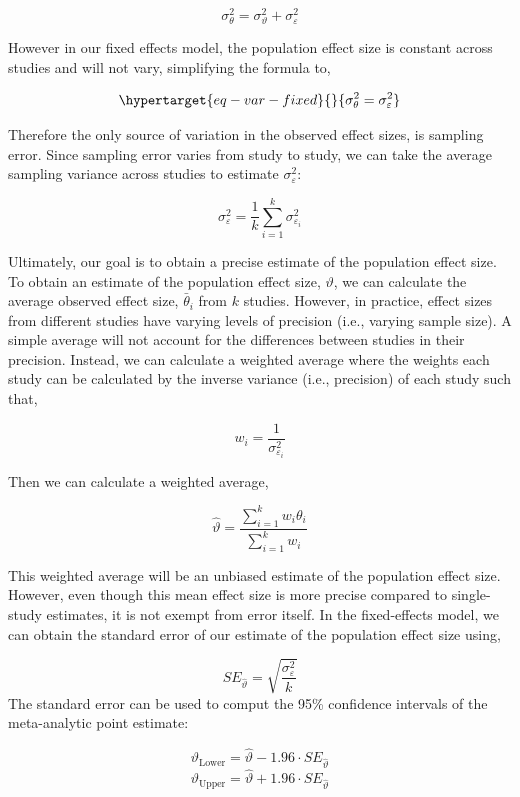 \documentclass[
  letterpaper,
  DIV=11,
  numbers=noendperiod]{scrreprt}
\begin{document}
\[
\sigma^2_\theta = \sigma^2_\vartheta + \sigma^2_\varepsilon
\]

However in our fixed effects model, the population effect size is
constant across studies and will not vary, simplifying the formula to,

\begin{equation}\protect\hypertarget{eq-var-fixed}{}{
\sigma^2_\theta = \sigma^2_\varepsilon
}\label{eq-var-fixed}\end{equation}

Therefore the only source of variation in the observed effect sizes, is
sampling error. Since sampling error varies from study to study, we can
take the average sampling variance across studies to estimate
\(\sigma^2_\varepsilon\):

\[
\sigma^2_\varepsilon=\frac{1}{k}\sum^k_{i=1}\sigma^2_{\varepsilon_i}
\]

Ultimately, our goal is to obtain a precise estimate of the population
effect size. To obtain an estimate of the population effect size,
\(\vartheta\), we can calculate the average observed effect size,
\(\bar{\theta}_i\) from \(k\) studies. However, in practice, effect
sizes from different studies have varying levels of precision (i.e.,
varying sample size). A simple average will not account for the
differences between studies in their precision. Instead, we can
calculate a weighted average where the weights each study can be
calculated by the inverse variance (i.e., precision) of each study such
that,

\[
w_i = \frac{1}{\sigma^2_{\varepsilon_i}}
\]

Then we can calculate a weighted average,

\[
\hat{\vartheta} =\frac{\sum^k_{i=1}w_i\theta_i}{\sum^k_{i=1}w_i}
\]

This weighted average will be an unbiased estimate of the population
effect size. However, even though this mean effect size is more precise
compared to single-study estimates, it is not exempt from error itself.
In the fixed-effects model, we can obtain the standard error of our
estimate of the population effect size using,

\[
SE_\hat{\vartheta} = \sqrt{\frac{\sigma^2_\varepsilon}{k}}
\] The standard error can be used to comput the 95\% confidence
intervals of the meta-analytic point estimate:

\[
\vartheta_{\text{Lower}} = \hat{\vartheta}- 1.96 \cdot SE_\hat{\vartheta}
\] \[
\vartheta_{\text{Upper}} = \hat{\vartheta}+ 1.96\cdot SE_\hat{\vartheta}
\]
\end{document}
